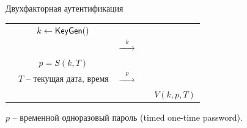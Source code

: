 \documentclass[usenames,dvipsnames,8pt,aspectratio=169]{beamer}
\begin{document}
\begin{frame}{Двухфакторная аутентификация}
\begin{tabular}{c c c c c}
		&  $k \leftarrow \textsf{KeyGen}()$ &  & &  \\
		&  &  $\xrightarrow{ \quad k \quad}$ & &  \\[10pt]
		&  $p = S(k, T)$ &  & &  \\
		& {\small $T$ -- текущая дата, время} & $\xrightarrow{ \quad p \quad}$   & &  \\
		& &  &  & $V(k, p, T)$ \\
	\end{tabular}

\vspace{10pt}
$p$ -- временной одноразовый пароль (timed one-time password).


\end{frame}
\end{document}
